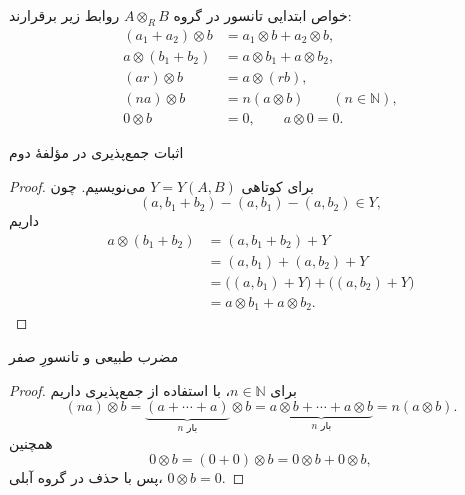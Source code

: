 \begin{frame}[t]{خواص ابتدایی تانسور}
    \label{lec19:elementary-identities}
    در گروه $A\otimes_R B$ روابط زیر برقرارند:
    \[
    \begin{aligned}
        (a_1+a_2)\otimes b&=a_1\otimes b+a_2\otimes b,\\[3pt]
        a\otimes(b_1+b_2)&=a\otimes b_1+a\otimes b_2,\\[3pt]
        (ar)\otimes b&=a\otimes(rb),\\[3pt]
        (na)\otimes b&=n(a\otimes b)\qquad(n\in\mathbb N),\\[3pt]
        0\otimes b&=0,\qquad a\otimes0=0.
    \end{aligned}
    \]
\end{frame}

\begin{frame}[t]{اثبات جمع‌پذیری در مؤلفهٔ دوم}
    \label{lec19:additivity-proof}
    \begin{proof}
    برای کوتاهی $Y=Y(A,B)$ می‌نویسیم. چون
    \[
        (a,b_1+b_2)-(a,b_1)-(a,b_2)\in Y,
    \]
    داریم
    \[
    \begin{aligned}
        a\otimes(b_1+b_2)
        &=(a,b_1+b_2)+Y\\
        &=(a,b_1)+(a,b_2)+Y\\
        &=\bigl((a,b_1)+Y\bigr)+\bigl((a,b_2)+Y\bigr)\\
        &=a\otimes b_1+a\otimes b_2.
    \end{aligned}
    \]
    \end{proof}
\end{frame}

\begin{frame}[t]{مضرب طبیعی و تانسورِ صفر}
    \label{lec19:multiples-zero-proof}
    \begin{proof}
    برای $n\in\mathbb N$، با استفاده از جمع‌پذیری داریم
    \[
        (na)\otimes b
        =\underbrace{(a+\cdots+a)}_{n\text{ بار}}\otimes b
        =\underbrace{a\otimes b+\cdots+a\otimes b}_{n\text{ بار}}
        =n(a\otimes b).
    \]
    همچنین
    \[
        0\otimes b=(0+0)\otimes b=0\otimes b+0\otimes b,
    \]
    پس با حذف در گروه آبلی، $0\otimes b=0$.
    \end{proof}
\end{frame}

